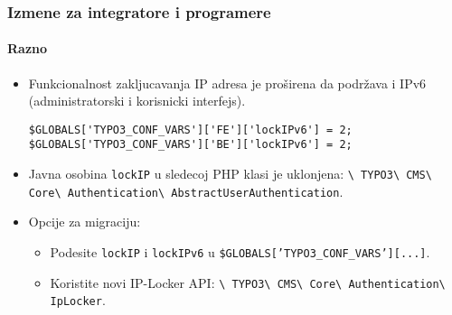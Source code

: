\begin{frame}[fragile]
	\frametitle{Izmene za integratore i programere}
	\framesubtitle{Razno}

	\lstset{basicstyle=\tiny\ttfamily}

	\begin{itemize}

		\item Funkcionalnost zakljucavanja IP adresa je proširena da podržava i IPv6
			(administratorski i korisnicki interfejs).

\begin{lstlisting}
$GLOBALS['TYPO3_CONF_VARS']['FE']['lockIPv6'] = 2;
$GLOBALS['TYPO3_CONF_VARS']['BE']['lockIPv6'] = 2;
\end{lstlisting}

		\item Javna osobina \texttt{lockIP} u sledecoj PHP klasi je uklonjena:\newline
			\small
				\texttt{\textbackslash
					TYPO3\textbackslash
					CMS\textbackslash
					Core\textbackslash
					Authentication\textbackslash
					AbstractUserAuthentication}.
			\normalsize

		\item Opcije za migraciju:

			\begin{itemize}\smaller
				\item[\ding{228}] Podesite \texttt{lockIP} i \texttt{lockIPv6} u \texttt{\$GLOBALS['TYPO3\_CONF\_VARS'][...]}.
				\item[\ding{228}] Koristite novi IP-Locker API:
					\texttt{\textbackslash
						TYPO3\textbackslash
						CMS\textbackslash
						Core\textbackslash
						Authentication\textbackslash
						IpLocker}.
			\end{itemize}\normalsize


	\end{itemize}

\end{frame}

